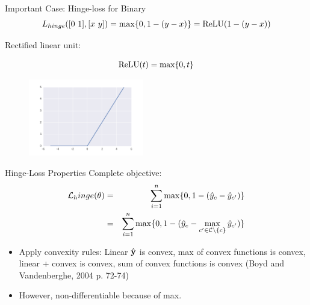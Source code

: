 \documentclass{beamer}
\begin{document}
\begin{frame}{Important Case: Hinge-loss for Binary }
  \[L_{hinge}([0\ 1], [x\ y]) = \max\{0, 1 - (y -x) \} = \relu(1 -(y-x)) \] 


  Rectified linear unit:

  \[\relu(t) = \max\{0, t\}  \]

  \begin{figure}
    \centering
    \includegraphics[width=5cm]{Relu}
  \end{figure}

\end{frame}








\begin{frame}{Hinge-Loss Properties}
  Complete objective:
  \begin{eqnarray*}
     \mathcal{L}_hinge(\theta) &=& \sum_{i=1}^n \max\{0, 1 - (\hat{y}_{c} - \hat{y}_{c'})\} \\
    &=& \sum_{i=1}^n \max\{0,  1 - (\hat{y}_{c} - \max_{c' \in \mathcal{C} \setminus\{c\}} \hat{y}_{c'}) \}     
  \end{eqnarray*}


  \begin{itemize}
  \item Apply convexity rules: Linear $\hat{\mathbf{y}}$ is convex, 
    max of convex functions is convex, linear + convex is convex, sum of convex functions is convex (Boyd and  Vandenberghe, 2004 p. 72-74)
  \item However, non-differentiable because of max.
  \end{itemize}
\end{frame}
\end{document}
